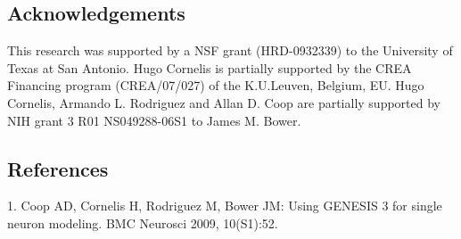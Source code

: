 \documentclass[12pt]{article}
\begin{document}
\subsection*{Acknowledgements}
This research was supported by a NSF grant (HRD-0932339) to the
University of Texas at San Antonio.  Hugo Cornelis is partially
supported by the CREA Financing program (CREA/07/027) of the
K.U.Leuven, Belgium, EU.  Hugo Cornelis, Armando L. Rodriguez and
Allan D. Coop are partially supported by NIH grant 3 R01 NS049288-06S1
to James M. Bower.


\subsection*{References}
1. Coop AD, Cornelis H, Rodriguez M, Bower JM: Using GENESIS 3 for single neuron modeling. BMC Neurosci 2009, 10(S1):52.
\end{document}
